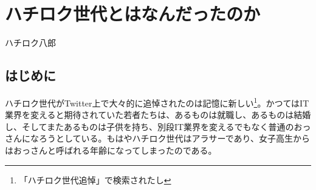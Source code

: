 
\chapter{ハチロク世代とはなんだったのか}

\begin{flushright}
 ハチロク八郎 %
\end{flushright}

\section{はじめに}

\lettrine{ハ}
チロク世代がTwitter上で大々的に追悼されたのは記憶に新しい\footnote{「ハチロク世代追悼」で検索されたし}。かつてはIT業界を変えると期待されていた若者たちは、あるものは就職し、あるものは結婚し、そしてまたあるものは子供を持ち、別段IT業界を変えるでもなく普通のおっさんになろうとしている。もはやハチロク世代はアラサーであり、女子高生からはおっさんと呼ばれる年齢になってしまったのである。
